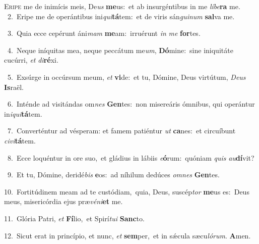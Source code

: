 \lettrine{\initial\textcolor{\initialcolor}{E}}{ripe} me de inimícis meis, De\textit{us} \textbf{me}\-us:~\star et ab insurgéntibus in me \textit{lí}\-\textit{be}\textbf{ra} me.\\
{\numbfont\textcolor{\numbcolor}{~2.}}~Eripe me de operántibus ini\-\textit{qui}\-\textbf{tá}tem:~\star et de viris sán\-\textit{gui}\-\textit{num} \textbf{sal}\-va me.\par
{\numbfont\textcolor{\numbcolor}{~3.}}~Quia ecce cepérunt áni\textit{mam} \textbf{me}\-am:~\star irruérunt \textit{in} \textit{me} \textbf{for}\-tes.\par
{\numbfont\textcolor{\numbcolor}{~4.}}~Neque iníquitas mea, neque peccátum me\-\textit{um}\-, \textbf{Dó}\-mine:~\star sine iniquitáte cucúrri, \textit{et} \textit{di}\-\textbf{ré}xi.\par
{\numbfont\textcolor{\numbcolor}{~5.}}~Exsúrge in occúrsum meum, \textit{et} \textbf{vi}\-de:~\star et tu, Dómine, Deus virtútum, \textit{De}\-\textit{us} \textbf{Is}\-raël.\par
{\numbfont\textcolor{\numbcolor}{~6.}}~Inténde ad visitándas om\textit{nes} \textbf{Gen}\-tes:~\star non misereáris ómnibus, qui operántur in\-\textit{i}\-\textit{qui}\textbf{tá}tem.\par
{\numbfont\textcolor{\numbcolor}{~7.}}~Converténtur ad vésperam: et famem patiéntur \textit{ut} \textbf{ca}\-nes:~\star et circuíbunt \textit{ci}\-\textit{vi}\textbf{tá}tem.\par
{\numbfont\textcolor{\numbcolor}{~8.}}~Ecce loquéntur in ore suo,~\dagger et gládius in lábiis \textit{e}\-\textbf{ó}rum:~\star quóniam \textit{quis} \textit{au}\-\textbf{dí}vit?\par
{\numbfont\textcolor{\numbcolor}{~9.}}~Et tu, Dómine, deridé\textit{bis} \textbf{e}\-os:~\star ad níhilum dedúces \textit{om}\-\textit{nes} \textbf{Gen}\-tes.\par
{\numbfont\textcolor{\numbcolor}{10.}}~Fortitúdinem meam ad te custódiam,~\dagger quia, Deus, suscép\textit{tor} \textbf{me}\-us es:~\star Deus meus, misericórdia ejus præ\-\textit{vé}\-\textit{ni}\textbf{et} me.\par
{\numbfont\textcolor{\numbcolor}{11.}}~Glória Patri, \textit{et} \textbf{Fí}\-lio,~\star et Spirí\-\textit{tu}\-\textit{i} \textbf{Sanc}\-to.\par
{\numbfont\textcolor{\numbcolor}{12.}}~Sicut erat in princípio, et nunc, \textit{et} \textbf{sem}\-per,~\star et in sǽcula sæcu\-\textit{ló}\-\textit{rum}. \textbf{A}\-men.\par
